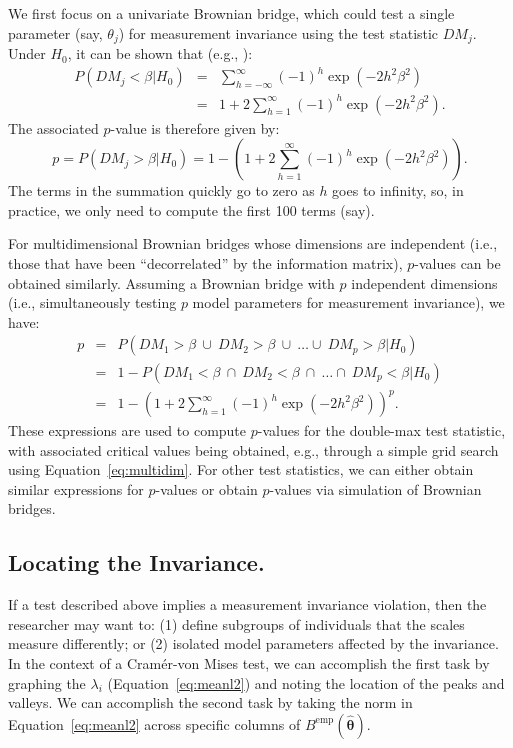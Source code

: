 \documentclass[man]{apa}
\begin{document}
We first focus on a univariate
Brownian bridge, which could test a single parameter (say, $\theta_j$) for
measurement invariance using the test statistic $DM_j$.
Under $H_0$, it can be shown that (e.g., ):
\begin{eqnarray}
    P(DM_j < \beta | H_0) &
    = & \sum_{h=-\infty}^{\infty} (-1)^h \exp(-2h^2\beta^2) \\
   & = & 1 + 2 \sum_{h=1}^{\infty} (-1)^h \exp(-2h^2\beta^2).
\end{eqnarray}
The associated $p$-value is therefore given by:
\begin{equation}
    \label{eq:absmax_p}
        p = P(DM_j > \beta | H_0)
    = 1 - (1 + 2 \sum_{h=1}^{\infty} (-1)^h \exp(-2h^2\beta^2)).
\end{equation}
The terms in the summation quickly go to zero as $h$ goes to infinity,
so, in practice, we only need to compute the first 100 terms (say).

For multidimensional Brownian bridges whose dimensions are independent
(i.e., those that 
have been ``decorrelated'' by the information matrix), $p$-values can
be obtained similarly.  Assuming a Brownian bridge with $p$
independent dimensions (i.e., simultaneously testing $p$ model
parameters for measurement invariance), we have:
\begin{eqnarray}
    \label{eq:multidim}
    p & = & P(DM_1 >
    \beta\ \cup\ DM_2 > \beta\ \cup\ \ldots \cup\ DM_p > \beta | H_0)
      \nonumber \\
   & = & 1 - P(DM_1 <
    \beta\ \cap\ DM_2 < \beta\ \cap\ \ldots \cap\ DM_p < \beta | H_0)
     \nonumber \\
   & = & 1 - \left ( 1 + 2 \sum_{h=1}^{\infty} (-1)^h
       \exp(-2h^2\beta^2) \right )^p.
\end{eqnarray}
These expressions are used to compute $p$-values for the double-max
test statistic, with associated critical values being
obtained, e.g., through a simple grid search using
Equation~\eqref{eq:multidim}.
For other test statistics, we can either obtain similar expressions
for $p$-values or obtain $p$-values via simulation of Brownian
bridges.

\subsection{Locating the Invariance.}
If a test described above implies a measurement invariance violation,
then the researcher may want to: (1) define subgroups of individuals that
the scales measure differently; or (2) isolated model
parameters affected by the invariance.  
In the context of a Cram\'{e}r-von Mises test, we can accomplish the
first task by graphing the $\lambda_i$ (Equation~\eqref{eq:meanl2})
and noting the location of the peaks and valleys.  We can accomplish
the second task by taking the norm in Equation~\eqref{eq:meanl2}
across specific columns of $B^{\text{emp}}(\widehat{\bm \theta})$.
\end{document}
